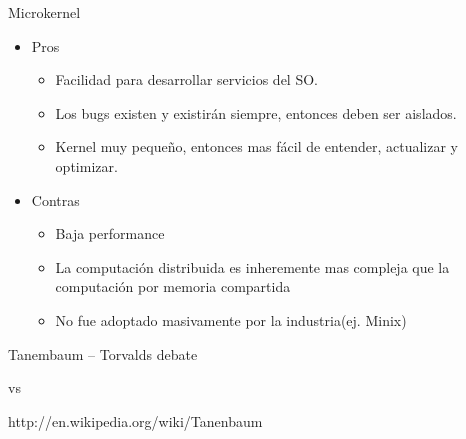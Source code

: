 \begin{frame}{Microkernel}

 \begin{itemize}
    \item Pros 
    \begin{itemize}
            \item \small Facilidad para desarrollar servicios del SO.
            \item \small Los bugs existen y existirán siempre, entonces deben ser aislados.
            \item  \small Kernel muy pequeño, entonces mas fácil de entender, actualizar y optimizar.  
       \end{itemize}
    \item Contras  
	\begin{itemize}
           \item  \small Baja performance
           \item  \small La computación distribuida es inheremente mas compleja que la computación por memoria compartida  
	   \item  \small No fue adoptado masivamente por la industria(ej. Minix)
	\end{itemize}
   \end{itemize} 
\end{frame}

\begin{frame}{Tanembaum – Torvalds debate}
  \begin{center}
      vs
   \end{center}
\begin{center}
 	http://en.wikipedia.org/wiki/Tanenbaum%
\end{center}
\end{frame}

